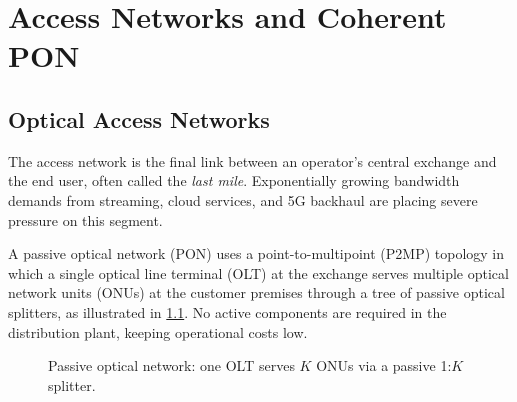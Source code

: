 \documentclass[12pt,a4paper]{report}
\begin{document}
\tableofcontents

\chapter{Access Networks and Coherent PON}\label{chapter:cpon}

\section{Optical Access Networks}
The access network is the final link between an operator's central exchange and the end user, often called the \emph{last mile}. Exponentially growing bandwidth demands from streaming, cloud services, and 5G backhaul are placing severe pressure on this segment. 

A passive optical network (PON) uses a point-to-multipoint (P2MP) topology in which a single optical line terminal (OLT) at the exchange serves multiple optical network units (ONUs) at the customer premises through a tree of passive optical splitters, as illustrated in \cref{fig:pon_intro}. No active components are required in the distribution plant, keeping operational costs low.

\begin{figure}[H]
    \centering
    \caption{Passive optical network: one OLT serves $K$ ONUs via a passive 1:$K$ splitter.}
    \label{fig:pon_intro}
\end{figure}
\end{document}
